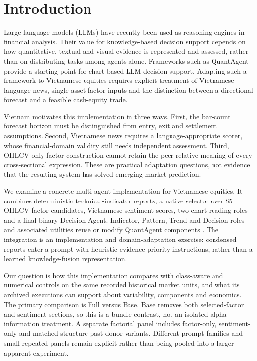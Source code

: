 \section{Introduction}
\label{sec:introduction}

Large language models (LLMs) have recently been used as reasoning engines in financial analysis. Their value for knowledge-based decision support depends on how quantitative, textual and visual evidence is represented and assessed, rather than on distributing tasks among agents alone. Frameworks such as QuantAgent \cite{xiong2025quantagent} provide a starting point for chart-based LLM decision support. Adapting such a framework to Vietnamese equities requires explicit treatment of Vietnamese-language news, single-asset factor inputs and the distinction between a directional forecast and a feasible cash-equity trade.

Vietnam motivates this implementation in three ways. First, the bar-count forecast horizon must be distinguished from entry, exit and settlement assumptions. Second, Vietnamese news requires a language-appropriate scorer, whose financial-domain validity still needs independent assessment. Third, OHLCV-only factor construction cannot retain the peer-relative meaning of every cross-sectional expression. These are practical adaptation questions, not evidence that the resulting system has solved emerging-market prediction.

We examine a concrete multi-agent implementation for Vietnamese equities. It combines deterministic technical-indicator reports, a native selector over 85 OHLCV factor candidates, Vietnamese sentiment scores, two chart-reading roles and a final binary Decision Agent. Indicator, Pattern, Trend and Decision roles and associated utilities reuse or modify QuantAgent components \cite{xiong2025quantagent}. The integration is an implementation and domain-adaptation exercise: condensed reports enter a prompt with heuristic evidence-priority instructions, rather than a learned knowledge-fusion representation.

Our question is how this implementation compares with class-aware and numerical controls on the same recorded historical market units, and what its archived executions can support about variability, components and economics. The primary comparison is Full versus Base. Base removes both selected-factor and sentiment sections, so this is a bundle contrast, not an isolated alpha-information treatment. A separate factorial panel includes factor-only, sentiment-only and matched-structure past-donor variants. Different prompt families and small repeated panels remain explicit rather than being pooled into a larger apparent experiment.

